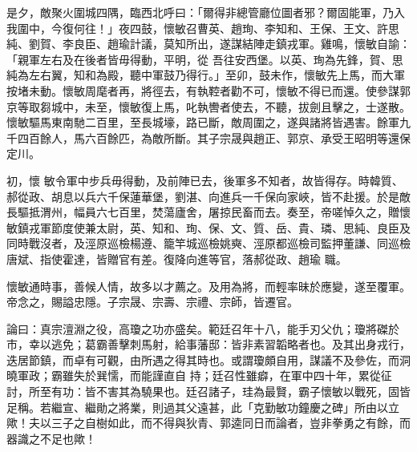 \begin{pinyinscope}
 是夕，敵聚火圍城四隅，臨西北呼曰：「爾得非總管廳位圖者邪？爾固能軍，乃入我圍中，今復何往！」夜四鼓，懷敏召曹英、趙珣、李知和、王保、王文、許思純、劉賀、李良臣、趙瑜計議，莫知所出，遂謀結陣走鎮戎軍。雞鳴，懷敏自諭：「親軍左右及在後者皆毋得動，平明，從
 吾往安西堡。以英、珣為先鋒，賀、思純為左右翼，知和為殿，聽中軍鼓乃得行。」至卯，鼓未作，懷敏先上馬，而大軍按堵未動。懷敏周麾者再，將徑去，有執鞚者勸不可，懷敏不得已而還。使參謀郭京等取芻城中，未至，懷敏復上馬，叱執轡者使去，不聽，拔劍且擊之，士遂散。懷敏驅馬東南馳二百里，至長城壕，路已斷，敵周圍之，遂與諸將皆遇害。餘軍九千四百餘人，馬六百餘匹，為敵所斷。其子宗晟與趙正、郭京、承受王昭明等還保定川。



 初，懷
 敏令軍中步兵毋得動，及前陣已去，後軍多不知者，故皆得存。時韓質、郝從政、胡息以兵六千保蓮華堡，劉湛、向進兵一千保向家峽，皆不赴援。於是敵長驅抵渭州，幅員六七百里，焚蕩廬舍，屠掠民畜而去。奏至，帝嗟悼久之，贈懷敏鎮戎軍節度使兼太尉，英、知和、珣、保、文、質、岳、貴、璘、思純、良臣及同時戰沒者，及涇原巡檢楊遵、籠竿城巡檢姚奭、涇原都巡檢司監押董謙、同巡檢唐斌、指使霍達，皆贈官有差。復降向進等官，落郝從政、趙瑜
 職。



 懷敏通時事，善候人情，故多以才薦之。及用為將，而輕率昧於應變，遂至覆軍。帝念之，賜謚忠隱。子宗晟、宗壽、宗禮、宗師，皆遷官。



 論曰：真宗澶淵之役，高瓊之功亦盛矣。範廷召年十八，能手刃父仇；瓊將磔於市，幸以逃免；葛霸善擊刺馬射，給事藩邸：皆非素習韜略者也。及其出身戎行，迭居節鎮，而卓有可觀，由所遇之得其時也。或謂瓊頗自用，謀議不及參佐，而洞曉軍政；霸雖失於巽懦，而能謹直自
 持；廷召性雖癖，在軍中四十年，累從征討，所至有功：皆不害其為驍果也。廷召諸子，珪為最賢，霸子懷敏以戰死，固皆足稱。若繼宣、繼勛之將業，則過其父遠甚，此「克勤敏功鐘慶之碑」所由以立歟！夫以三子之自樹如此，而不得與狄青、郭逵同日而論者，豈非拳勇之有餘，而器識之不足也歟！



\end{pinyinscope}